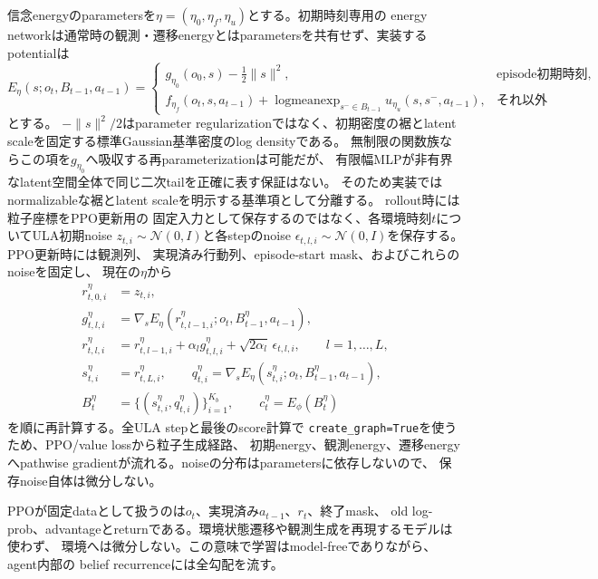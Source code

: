 \documentclass[a4paper,11pt]{article}
\newcommand{\Normal}{\mathcal{N}}
\begin{document}
信念energyのparametersを$\eta=(\eta_0,\eta_f,\eta_u)$とする。初期時刻専用の
energy networkは通常時の観測・遷移energyとはparametersを共有せず、実装するpotentialは
\begin{equation}
  E_\eta(s;o_t,B_{t-1},a_{t-1})=
  \begin{cases}
    g_{\eta_0}(o_0,s)-\frac12\lVert s\rVert^2,
      & \text{episode初期時刻},\\
    f_{\eta_f}(o_t,s,a_{t-1})
      +\operatorname{logmeanexp}_{s^-\in B_{t-1}}
        u_{\eta_u}(s,s^-,a_{t-1}),
      & \text{それ以外}
  \end{cases}
  \label{eq:belief-energy-piecewise}
\end{equation}
とする。
$-\lVert s\rVert^2/2$はparameter regularizationではなく、初期密度の裾とlatent
scaleを固定する標準Gaussian基準密度のlog densityである。
無制限の関数族ならこの項を$g_{\eta_0}$へ吸収する再parameterizationは可能だが、
有限幅MLPが非有界なlatent空間全体で同じ二次tailを正確に表す保証はない。
そのため実装ではnormalizableな裾とlatent scaleを明示する基準項として分離する。
rollout時には粒子座標をPPO更新用の
固定入力として保存するのではなく、各環境時刻$t$についてULA初期noise
$z_{t,i}\sim\Normal(0,I)$と各stepのnoise
$\epsilon_{t,l,i}\sim\Normal(0,I)$を保存する。PPO更新時には観測列、
実現済み行動列、episode-start mask、およびこれらのnoiseを固定し、
現在の$\eta$から
\begin{align}
  r^{\eta}_{t,0,i}
    &=z_{t,i},\\
  g^\eta_{t,l,i}
    &=\nabla_s E_\eta\!\left(
      r^\eta_{t,l-1,i};o_t,B^\eta_{t-1},a_{t-1}
    \right),\\
  r^\eta_{t,l,i}
    &=r^\eta_{t,l-1,i}
      +\alpha_l g^\eta_{t,l,i}
      +\sqrt{2\alpha_l}\,\epsilon_{t,l,i},
      \qquad l=1,\ldots,L,\\
  s^\eta_{t,i}
    &=r^\eta_{t,L,i},\qquad
  q^\eta_{t,i}
    =\nabla_s E_\eta\!\left(
      s^\eta_{t,i};o_t,B^\eta_{t-1},a_{t-1}
    \right),\\
  B^\eta_t
    &=\{(s^\eta_{t,i},q^\eta_{t,i})\}_{i=1}^{K_b},
    \qquad c^\eta_t=E_\phi(B^\eta_t)
  \label{eq:belief-replay}
\end{align}
を順に再計算する。全ULA stepと最後のscore計算で
\verb|create_graph=True|を使うため、PPO/value lossから粒子生成経路、
初期energy、観測energy、遷移energyへpathwise gradientが流れる。noiseの分布はparametersに依存しないので、
保存noise自体は微分しない。

PPOが固定dataとして扱うのは$o_t$、実現済み$a_{t-1}$、$r_t$、終了mask、
old log-prob、advantageとreturnである。環境状態遷移や観測生成を再現するモデルは使わず、
環境へは微分しない。この意味で学習はmodel-freeでありながら、agent内部の
belief recurrenceには全勾配を流す。
\end{document}
